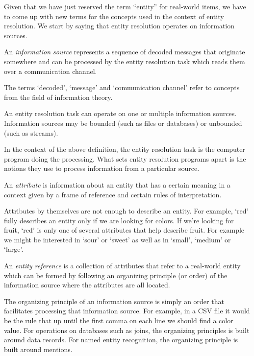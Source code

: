 \documentclass[lettersize,journal]{IEEEtran}
\begin{document}
    Given that we have just reserved the term ``entity'' for real-world items,
    we have to come up with new terms for the concepts used in the context of
    entity resolution.
    We start by saying that entity resolution operates on information sources.

    \begin{defn}
        An \textit{information source} represents a sequence of decoded messages
        that originate somewhere and can be processed by the entity resolution
        task which reads them over a communication channel.
    \end{defn}

    The terms `decoded', `message' and `communication channel' refer to concepts
    from the field of information theory\cite{ash2012it}.
    
    An entity resolution task can operate on one or multiple information
    sources.
    Information sources may be bounded (such as files or databases) or unbounded
    (such as streams).
    
    In the context of the above definition, the entity resolution task is the
    computer program doing the processing.
    What sets entity resolution programs apart is the notions they use to
    process information from a particular source.

    \begin{defn}
        An \textit{attribute} is information about an entity that has a certain
        meaning in a context given by a frame of reference and certain rules of
        interpretation.
    \end{defn}

    Attributes by themselves are not enough to describe an entity.
    For example, `red' fully describes an entity only if we are looking for
    colors.
    If we're looking for fruit, `red' is only one of several attributes that
    help describe fruit.
    For example we might be interested in `sour' or `sweet' as well as in
    `small', `medium' or `large'.

    \begin{defn}
        An \textit{entity reference} is a collection of attributes that refer
        to a real-world entity which can be formed by following an organizing
        principle (or order) of the information source where the attributes are
        all located.
    \end{defn}

    The organizing principle of an information source is simply an order that
    facilitates processing that information source.
    For example, in a CSV file it would be the rule that up until the first
    comma on each line we should find a color value.
    For operations on databases such as joins, the organizing principles is
    built around data records.
    For named entity recognition, the organizing principle is built around
    mentions.
\end{document}
